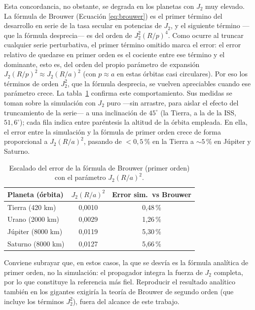 Esta concordancia, no obstante, se degrada en los planetas con $J_2$ muy elevado. La fórmula de Brouwer (Ecuación \ref{eq:brouwer}) es el primer término del desarrollo en serie de la tasa secular en potencias de $J_2$, y el siguiente término ---que la fórmula desprecia--- es del orden de $J_2^2(R/p)^4$. Como ocurre al truncar cualquier serie perturbativa, el primer término omitido marca el error: el error relativo de quedarse en primer orden es el cociente entre ese término y el dominante, esto es, del orden del propio parámetro de expansión $J_2(R/p)^2 \approx J_2(R/a)^2$ (con $p\approx a$ en estas órbitas casi circulares). Por eso los términos de orden $J_2^2$, que la fórmula desprecia, se vuelven apreciables cuando ese parámetro crece. La tabla~\ref{tab:brouwer-escalado} confirma este comportamiento. Sus medidas se toman sobre la simulación con $J_2$ puro ---sin arrastre, para aislar el efecto del truncamiento de la serie--- a una inclinación de $45^\circ$ (la Tierra, a la de la ISS, $51{,}6^\circ$); cada fila indica entre paréntesis la altitud de la órbita empleada. En ella, el error entre la simulación y la fórmula de primer orden crece de forma proporcional a $J_2(R/a)^2$, pasando de $<0{,}5$\,\% en la Tierra a $\sim 5$\,\% en Júpiter y Saturno.

\begin{table}[htbp]
  \centering
  \caption{Escalado del error de la fórmula de Brouwer (primer orden) con el parámetro $J_2(R/a)^2$.}
  \label{tab:brouwer-escalado}
  \begin{tabular}{l c c}
    \hline
    \textbf{Planeta (órbita)} & $J_2(R/a)^2$ & \textbf{Error sim.\ vs Brouwer} \\
    \hline
    Tierra (420 km)   & 0,0010 & 0,48\,\% \\
    Urano (2000 km)   & 0,0029 & 1,26\,\% \\
    Júpiter (8000 km) & 0,0119 & 5,30\,\% \\
    Saturno (8000 km) & 0,0127 & 5,66\,\% \\
    \hline
  \end{tabular}
\end{table}

Conviene subrayar que, en estos casos, la que se desvía es la fórmula analítica de primer orden, no la simulación: el propagador integra la fuerza de $J_2$ completa, por lo que constituye la referencia más fiel. Reproducir el resultado analítico también en los gigantes exigiría la teoría de Brouwer de segundo orden (que incluye los términos $J_2^2$), fuera del alcance de este trabajo.

